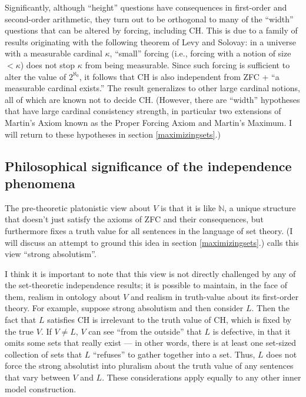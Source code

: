 \documentclass[letterpaper,12pt]{article}
\begin{document}
Significantly, although ``height'' questions have consequences in first-order and second-order arithmetic, they turn out to be orthogonal to many of the ``width'' questions that can be altered by forcing, including CH. This is due to a family of results originating with the following theorem of Levy and Solovay: in a universe with a measurable cardinal $\kappa$, ``small'' forcing (i.e., forcing with a notion of size $< \kappa$) does not stop $\kappa$ from being measurable. Since such forcing is sufficient to alter the value of $2^{\aleph_0}$, it follows that CH is also independent from ZFC + ``a measurable cardinal exists.'' The result generalizes to other large cardinal notions, all of which are known not to decide CH. (However, there are ``width'' hypotheses that have large cardinal consistency strength, in particular two extensions of Martin's Axiom known as the Proper Forcing Axiom and Martin's Maximum. I will return to these hypotheses in section \ref{maximizingsets}.)

\subsection{Philosophical significance of the independence phenomena}
\label{philosophicalsignificance}
The pre-theoretic platonistic view about $V$ is that it is like $\mathbb{N}$, a unique structure that doesn't just satisfy the axioms of ZFC and their consequences, but furthermore fixes a truth value for all sentences in the language of set theory. (I will discuss an attempt to ground this idea in section \ref{maximizingsets}.) \cite{steel2012godel} calls this view ``strong absolutism''.

I think it is important to note that this view is not directly challenged by any of the set-theoretic independence results; it is possible to maintain, in the face of them, realism in ontology about $V$ and realism in truth-value about its first-order theory. For example, suppose strong absolutism and then consider $L$. Then the fact that $L$ satisfies CH is irrelevant to the truth value of CH, which is fixed by the true $V$. If $V \not = L$, $V$ can see ``from the outside'' that $L$ is defective, in that it omits some sets that really exist --- in other words, there is at least one set-sized collection of sets that $L$ ``refuses'' to gather together into a set. Thus, $L$ does not force the strong absolutist into pluralism about the truth value of any sentences that vary between $V$ and $L$. These considerations apply equally to any other inner model construction.
\end{document}

